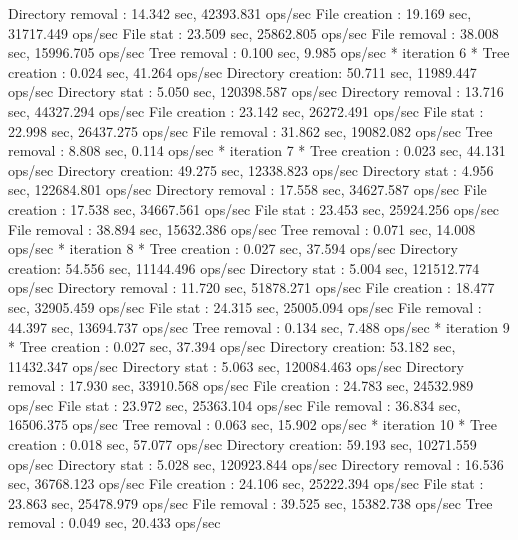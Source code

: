 \documentclass[conference,compsoc]{IEEEtran}
\begin{document}
   Directory removal :     14.342 sec,  42393.831 ops/sec
   File creation     :     19.169 sec,  31717.449 ops/sec
   File stat         :     23.509 sec,  25862.805 ops/sec
   File removal      :     38.008 sec,  15996.705 ops/sec
   Tree removal      :      0.100 sec,      9.985 ops/sec
 * iteration 6 *
   Tree creation     :      0.024 sec,     41.264 ops/sec
   Directory creation:     50.711 sec,  11989.447 ops/sec
   Directory stat    :      5.050 sec, 120398.587 ops/sec
   Directory removal :     13.716 sec,  44327.294 ops/sec
   File creation     :     23.142 sec,  26272.491 ops/sec
   File stat         :     22.998 sec,  26437.275 ops/sec
   File removal      :     31.862 sec,  19082.082 ops/sec
   Tree removal      :      8.808 sec,      0.114 ops/sec
 * iteration 7 *
   Tree creation     :      0.023 sec,     44.131 ops/sec
   Directory creation:     49.275 sec,  12338.823 ops/sec
   Directory stat    :      4.956 sec, 122684.801 ops/sec
   Directory removal :     17.558 sec,  34627.587 ops/sec
   File creation     :     17.538 sec,  34667.561 ops/sec
   File stat         :     23.453 sec,  25924.256 ops/sec
   File removal      :     38.894 sec,  15632.386 ops/sec
   Tree removal      :      0.071 sec,     14.008 ops/sec
 * iteration 8 *
   Tree creation     :      0.027 sec,     37.594 ops/sec
   Directory creation:     54.556 sec,  11144.496 ops/sec
   Directory stat    :      5.004 sec, 121512.774 ops/sec
   Directory removal :     11.720 sec,  51878.271 ops/sec
   File creation     :     18.477 sec,  32905.459 ops/sec
   File stat         :     24.315 sec,  25005.094 ops/sec
   File removal      :     44.397 sec,  13694.737 ops/sec
   Tree removal      :      0.134 sec,      7.488 ops/sec
 * iteration 9 *
   Tree creation     :      0.027 sec,     37.394 ops/sec
   Directory creation:     53.182 sec,  11432.347 ops/sec
   Directory stat    :      5.063 sec, 120084.463 ops/sec
   Directory removal :     17.930 sec,  33910.568 ops/sec
   File creation     :     24.783 sec,  24532.989 ops/sec
   File stat         :     23.972 sec,  25363.104 ops/sec
   File removal      :     36.834 sec,  16506.375 ops/sec
   Tree removal      :      0.063 sec,     15.902 ops/sec
 * iteration 10 *
   Tree creation     :      0.018 sec,     57.077 ops/sec
   Directory creation:     59.193 sec,  10271.559 ops/sec
   Directory stat    :      5.028 sec, 120923.844 ops/sec
   Directory removal :     16.536 sec,  36768.123 ops/sec
   File creation     :     24.106 sec,  25222.394 ops/sec
   File stat         :     23.863 sec,  25478.979 ops/sec
   File removal      :     39.525 sec,  15382.738 ops/sec
   Tree removal      :      0.049 sec,     20.433 ops/sec
\end{document}
